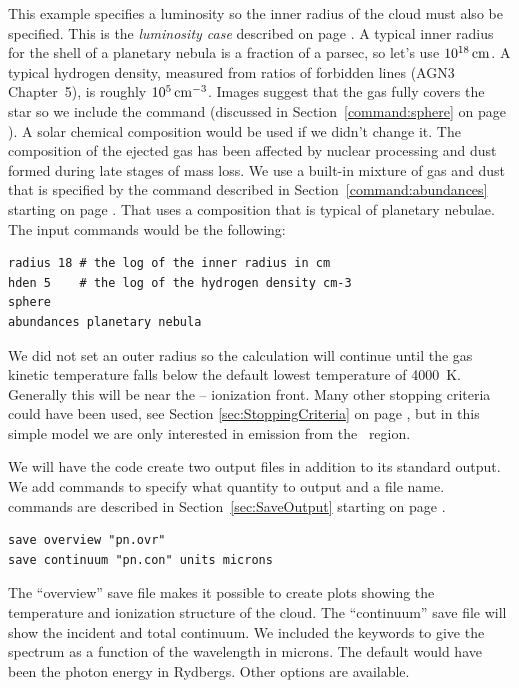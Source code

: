 \documentclass[12pt,twoside]{article}
\begin{document}
This example specifies a luminosity so the inner radius of the cloud
must also be specified.
This is the \emph{luminosity case} described on
page \pageref{sec:LuminosityVsIntensityCases}.
A typical inner radius for the shell of a planetary nebula is a fraction
of a parsec, so let's use $10^{18} {\rm\thinspace cm}$.
A typical hydrogen density, measured
from ratios of forbidden lines (AGN3 Chapter~5),
is roughly $10^5 {\rm\thinspace cm^{-3}}$.
Images suggest that the gas fully covers the star so we include the
 command (discussed in Section~\ref{command:sphere}
on page \pageref{command:sphere}).
A solar chemical composition would be used if we didn't change it.
The composition of
the ejected gas has been affected by nuclear processing and
dust formed during late stages of mass loss.
We use a built-in mixture of gas and dust that is specified
by the  command
described in Section~\ref{command:abundances} starting
on page \pageref{command:abundances}.
That uses a composition that is typical of planetary nebulae.
The input commands would be the following:
\small
\begin{verbatim}
radius 18 # the log of the inner radius in cm
hden 5    # the log of the hydrogen density cm-3
sphere
abundances planetary nebula
\end{verbatim}
\normalsize
We did not set an outer radius so the calculation will continue until the
gas kinetic temperature falls below the default
lowest temperature of 4000~K.
Generally this will be near the \hplus -- \hO ionization front.
Many other stopping criteria
could have been used, see Section \ref{sec:StoppingCriteria}
on page \pageref{sec:StoppingCriteria}, but in
this simple model we are only interested in
emission from the \hplus\ region.

We will have the code create two output files in addition to its standard
output.
We add  commands to specify what quantity
to output and a file name.
 commands are described in Section~\ref{sec:SaveOutput}
starting on page \pageref{sec:SaveOutput}.
\small
\begin{verbatim}
save overview "pn.ovr"
save continuum "pn.con" units microns
\end{verbatim}
\normalsize
The ``overview'' save file makes it possible to create plots showing the
temperature and ionization structure of the cloud.  The ``continuum'' save
file will show the incident and total continuum.  We included the keywords
 to give the spectrum
as a function of the wavelength in
microns.
The default would have been the photon energy in Rydbergs.
Other options are available.
\end{document}

